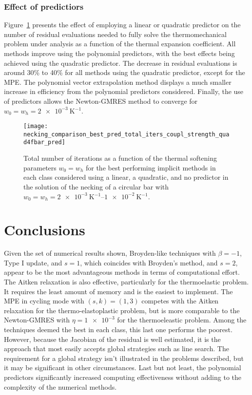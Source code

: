 \subsubsection{Effect of predictiors}

Figure~\ref{fig:necking_comparison_best_pred_total_iters_coupl_strength_quad4fbar_pred} presents the effect of employing a linear or quadratic predictor on the number of residual evaluations needed to fully solve the thermomechanical problem under analysis as a function of the thermal expansion coefficient.
All methods improve using the polynomial predictors, with the best effects being achieved using the quadratic predictor.
The decrease in residual evaluations is around 30\% to 40\% for all methods using the quadratic predictor, except for the MPE.
The polynomial vector extrapolation method displays a much smaller increase in efficiency from the polynomial predictors considered.
Finally, the use of predictors allows the Newton-GMRES method to converge for \(w_0=w_h=\SI{2e-3}{\kelvin^{-1}}\).

\begin{figure}[hbtp]
 \texttt{[image: necking\_comparison\_best\_pred\_total\_iters\_coupl\_strength\_quad4fbar\_pred]}
 \caption{Total number of iterations as a function of the thermal softening parameters \(w_0=w_h\) for the best performing implicit methods in each class considered using a linear, a quadratic, and no predictor in the solution of the necking of a circular bar with \(w_0=w_h=\SIrange{2e-3}{1e-2}{\kelvin^{-1}}\).}
\label{fig:necking_comparison_best_pred_total_iters_coupl_strength_quad4fbar_pred}
\end{figure}


\section{Conclusions}

Given the set of numerical results shown, Broyden-like techniques with \(\beta=-1\), Type I update, and \(s=1\), which coincides with Broyden's method, and \(s=2\), appear to be the most advantageous methods in terms of computational effort.
The Aitken relaxation is also effective, particularly for the thermoelastic problem.
It requires the least amount of memory and is the easiest to implement.
The MPE in cycling mode with \((s,k)=(1,3)\) competes with the Aitken relaxation for the thermo-elastoplastic problem, but is more comparable to the Newton-GMRES with \(\eta=\num{1e-3}\) for the thermoeleastic problem.
Among the techniques deemed the best in each class, this last one performs the poorest.
However, because the Jacobian of the residual is well estimated, it is the approach that most easily accepts global strategies such as line search.
The requirement for a global strategy isn't illustrated in the problems described, but it may be significant in other circumstances.
Last but not least, the polynomial predictors significantly increased computing effectiveness without adding to the complexity of the numerical methods.

\FloatBarrier
